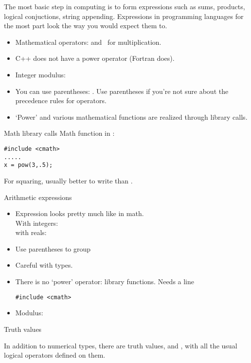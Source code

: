 The most basic step in computing is to form expressions such as sums,
products, logical conjuctions, string appending. Expressions in
programming languages for the most part look the way you would expect
them to.
\begin{itemize}
\item Mathematical operators: \n{+ - /} and \n{*}~for multiplication.
\item C++ does not have a power operator (Fortran does).
\item Integer modulus:~
\item You can use parentheses: . Use parentheses if you're
  not sure about the precedence rules for operators.
\item `Power' and various mathematical functions are realized through
  library calls.
\end{itemize}

\begin{block}{Math library calls}
  \label{sl:cmath}
  Math function in :
\begin{verbatim}
#include <cmath>
.....
x = pow(3,.5);
\end{verbatim}
For squaring, usually better to write  than .
\end{block}

\begin{slide}{Arithmetic expressions}
  \label{sl:arith-expr}
  \begin{itemize}
  \item
    Expression looks pretty much like in math.\\
    With integers: \\
    with reals: 
  \item Use parentheses to group 
  \item Careful with types.
  \item There is no `power' operator: library functions. Needs a line
\begin{verbatim}
#include <cmath>
\end{verbatim}
  \item Modulus: 
  \end{itemize}
\end{slide}

 {Truth values}

In addition to numerical types, there are truth values,
 and , with all the usual logical
operators defined on them.

